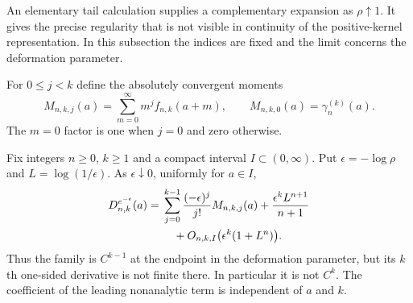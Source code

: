 An elementary tail calculation supplies a complementary expansion as
$\rho\uparrow1$. It gives the precise regularity that is not visible
in continuity of the positive-kernel representation. In this subsection
the indices are fixed and the limit concerns the deformation parameter.

For $0\leq j<k$ define the absolutely convergent moments
\begin{equation}\label{cont26:eq:bif-weighted-moments}
 M_{n,k,j}(a)=\sum_{m=0}^{\infty}m^j f_{n,k}(a+m),
 \qquad M_{n,k,0}(a)=\gamma_n^{(k)}(a).
\end{equation}
The $m=0$ factor is one when $j=0$ and zero otherwise.

\begin{theorem}
\label{cont26:thm:bif-rho-one}
Fix integers $n\geq0$, $k\geq1$ and a compact interval
$I\subset(0,\infty)$. Put $\epsilon=-\log\rho$ and
$L=\log(1/\epsilon)$. As $\epsilon\downarrow0$, uniformly for $a\in I$,
\begin{align}\label{cont26:eq:bif-rho-one}
 D_{n,k}^{e^{-\epsilon}}(a)
  ={}&\sum_{j=0}^{k-1}\frac{(-\epsilon)^j}{j!}M_{n,k,j}(a)
       +\frac{\epsilon^k L^{n+1}}{n+1}\\
     &\quad+O_{n,k,I}\bigl(\epsilon^k(1+L^n)\bigr).\notag
\end{align}
Thus the family is $C^{k-1}$ at the endpoint in the deformation
parameter, but its $k$th one-sided derivative is not finite there.
In particular it is not $C^k$. The coefficient of the leading
nonanalytic term is independent of $a$ and $k$.
\end{theorem}
